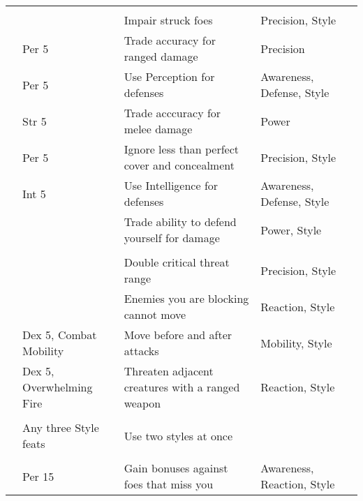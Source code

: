 \begin{longtabuwrapper}
\begin{longtabu}{>{\lcol}p{10em} >{\lcol}p{15em} >{\lcol}X >{\lcol}p{6em} >{\lcol}p{3em}}
        \midrule
         &  &  &  &  \\
         & \x & Impair struck foes & Precision, Style &  \\
         & Per 5 & Trade accuracy for ranged damage & Precision &  \\
         & Per 5 & Use Perception for defenses & Awareness, Defense, Style &  \\
         & Str 5 & Trade acccuracy for melee damage & Power &  \\
         & Per 5 & Ignore less than perfect cover and concealment & Precision, Style &  \\
         & Int 5 & Use Intelligence for defenses & Awareness, Defense, Style &  \\
         & \x & Trade ability to defend yourself for damage & Power, Style &  \\

        \midrule
         &  &  &  &  \\
         & \x & Double critical threat range & Precision, Style &  \\
         & \x & Enemies you are blocking cannot move & Reaction, Style &  \\
         & Dex 5, Combat Mobility & Move before and after attacks & Mobility, Style &  \\
         & Dex 5, Overwhelming Fire & Threaten adjacent creatures with a ranged weapon & Reaction, Style &  \\

        \midrule
         &  &  &  &  \\
         & Any three Style feats & Use two styles at once & \x &  \\

        \midrule
         &  &  &  &  \\
         & Per 15 & Gain bonuses against foes that miss you & Awareness, Reaction, Style &  \\
    \end{longtabu}
\end{longtabuwrapper}

